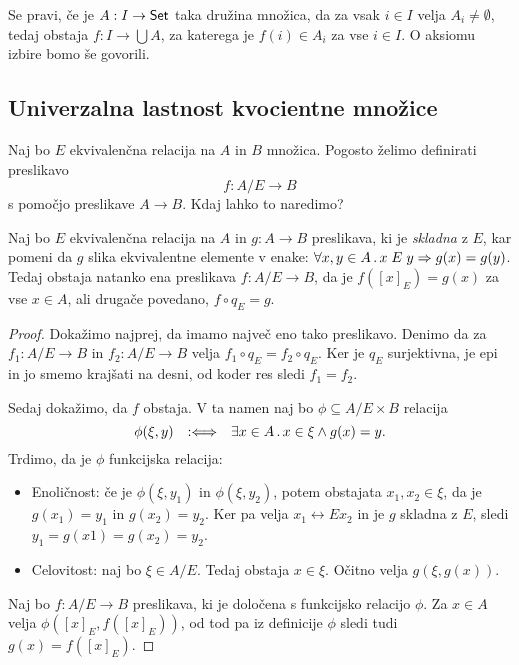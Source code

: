 Se pravi, če je $A : I \to \mathsf{Set}$ taka družina množica, da za vsak $i \in I$ velja $A_i \neq \emptyset$,
tedaj obstaja $f : I \to \bigcup A$, za katerega je $f(i) \in A_i$ za vse $i \in I$.
%
O aksiomu izbire bomo še govorili.


\subsection{Univerzalna lastnost kvocientne množice}

Naj bo $E$ ekvivalenčna relacija na $A$ in $B$ množica. Pogosto želimo definirati
preslikavo
%
\begin{equation*}
    f : A/E \to B
\end{equation*}
%
s pomočjo preslikave $A \to B$. Kdaj lahko to naredimo?

\begin{izrek}
  Naj bo $E$ ekvivalenčna relacija na $A$ in $g : A \to B$ preslikava, ki je \emph{skladna} z $E$, kar pomeni da $g$
  slika ekvivalentne elemente v enake: $\forall x, y \in A \,.\, x \mathrel{E} y \Rightarrow g(x) = g(y)$. Tedaj obstaja natanko ena
  preslikava $f : A/E \to B$, da je $f([x]_E) = g(x)$ za vse $x \in A$, ali drugače povedano, $f \circ q_E = g$.
\end{izrek}

\begin{proof}
  Dokažimo najprej, da imamo največ eno tako preslikavo. Denimo da za $f_1 : A/E \to B$ in
  $f_2 : A/E \to B$ velja $f_1 \circ q_E = f_2 \circ q_E$. Ker je $q_E$ surjektivna, je epi in jo smemo
  krajšati na desni, od koder res sledi $f_1 = f_2$.

  Sedaj dokažimo, da $f$ obstaja. V ta namen naj bo $\phi \subseteq A/E \times B$ relacija
  \begin{equation*}
    \phi(\xi, y) \quad {{:}{\Longleftrightarrow}}\quad \exists x \in A \,.\, x \in \xi \land g(x) = y.
  \end{equation*}
  Trdimo, da je $\phi$ funkcijska relacija:
  \begin{itemize}
  \item
    Enoličnost: če je $\phi(\xi, y_1)$ in $\phi(\xi, y_2)$, potem obstajata $x_1, x_2 \in \xi$, da je $g(x_1) = y_1$
    in $g(x_2) = y_2$. Ker pa velja $x_1 \rel{E} x_2$ in je $g$ skladna z $E$, sledi $y_1 = g(x1) = g(x_2) = y_2$.

  \item  Celovitost: naj bo $\xi \in A/E$. Tedaj obstaja $x \in \xi$. Očitno velja $g(\xi, g(x))$.
  \end{itemize}
  Naj bo $f : A/E \to B$ preslikava, ki je določena s funkcijsko relacijo $\phi$. Za $x \in A$
  velja $\phi([x]_E, f([x]_E))$, od tod pa iz definicije $\phi$ sledi tudi $g(x) = f([x]_E)$.
\end{proof}


